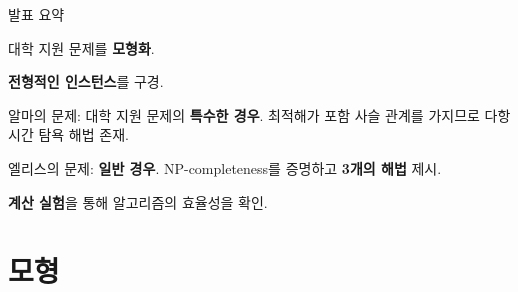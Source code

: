 \documentclass[10pt,slidestop,compress,mathserif,notheorems]{beamer}
\newif\ifen
\theoremstyle{definition}
\theoremstyle{definition}
\begin{document}
\begin{frame}{\ifen Agenda\else 발표 요약 \fi}
\ifen {
\textbf{Formulate} the college application problem.

Check out some \textbf{typical instances}.

Alma's problem: A \textbf{special case}. Nestedness of solutions implies validity of a polynomial-time greedy algorithm.

Ellis's problem: The \textbf{general case}. We provide an NP-completeness proof and \textbf{three algorithms}.

\textbf{Computational results} show the efficacy of our algorithms.
} \else {
대학 지원 문제를 \textbf{모형화}.

\textbf{전형적인 인스턴스}를 구경.

알마의 문제: 대학 지원 문제의 \textbf{특수한 경우}. 최적해가 포함 사슬 관계를 가지므로 다항 시간 탐욕 해법 존재.

엘리스의 문제: \textbf{일반 경우}. NP-completeness를 증명하고 \textbf{3개의 해법} 제시.%

\textbf{계산 실험}을 통해 알고리즘의 효율성을 확인.
} \fi
\end{frame}





\ifen \section{Model} \else \section{모형}\fi
\end{document}
